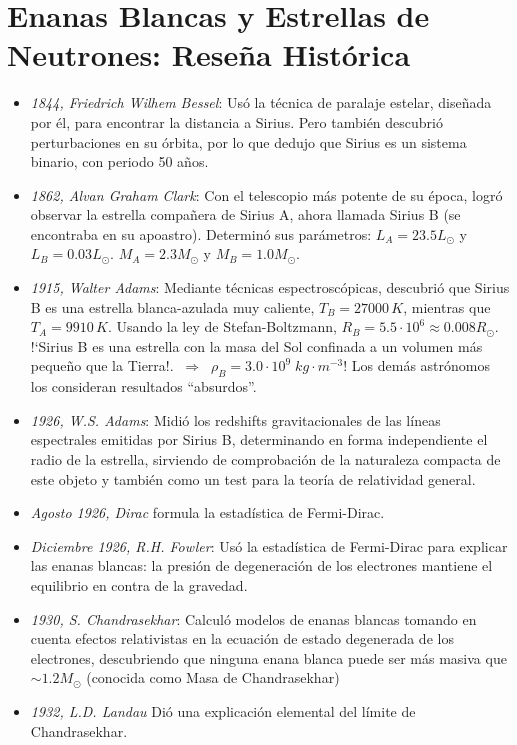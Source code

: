 \chapter{Enanas Blancas y Estrellas de Neutrones: Reseña Histórica}

\begin{itemize}
 \item \emph{1844, Friedrich Wilhem Bessel}: Usó la técnica de paralaje estelar, diseñada por él, para encontrar la distancia a Sirius. Pero también descubrió perturbaciones en su órbita, por lo que dedujo que Sirius es un sistema binario, con periodo 50 años.
\item \emph{1862, Alvan Graham Clark}: Con el telescopio más potente de su época, logró observar la estrella compañera de Sirius A, ahora llamada Sirius B (se encontraba en su apoastro). Determinó sus parámetros: $L_A=23.5L_{\odot}$ y  $L_B=0.03L_{\odot}$. $M_A=2.3M_{\odot}$ y $M_B =1.0M_{\odot}$.
\item \emph{1915, Walter Adams}: Mediante técnicas espectroscópicas, descubrió que Sirius B es una estrella blanca-azulada muy caliente, $T_B=27000\,K$, mientras que $T_A=9910\,K$. Usando la ley de Stefan-Boltzmann, $R_B=5.5\cdot10^{6}\approx0.008R_{\odot}$. !`Sirius B es una estrella con la masa del Sol confinada a un volumen más pequeño que la Tierra!.$\;\;\Rightarrow\;\;\rho_B=3.0\cdot10^{9}\;kg\cdot m^{-3}$! Los demás astrónomos los consideran resultados ``absurdos''.
\item \emph{1926, W.S. Adams}: Midió los redshifts gravitacionales de las líneas espectrales emitidas por Sirius B, determinando en forma independiente el radio de la estrella, sirviendo de comprobación de la naturaleza compacta de este objeto y también como un test para la teoría de relatividad general.
\item \emph{Agosto 1926, Dirac} formula la estadística de Fermi-Dirac.
\item \emph{Diciembre 1926, R.H. Fowler}: Usó la estadística de Fermi-Dirac para explicar las enanas blancas: la presión de degeneración de los electrones mantiene el equilibrio en contra de la gravedad.
\item \emph{1930, S. Chandrasekhar}: Calculó modelos de enanas blancas tomando en cuenta efectos relativistas en la ecuación de estado degenerada de los electrones, descubriendo que ninguna enana blanca puede ser más masiva que $\sim1.2 M_{\odot}$ (conocida como Masa de Chandrasekhar)
\item \emph{1932, L.D. Landau} Dió una explicación elemental del límite de Chandrasekhar.

\end{itemize}
